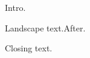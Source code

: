 \documentclass{article}\usepackage{setspace,lscape,multicol}
\begin{document}
Intro.

\begingroup\landscape Landscape text.\endgroup After.

Closing text.
\end{document}
